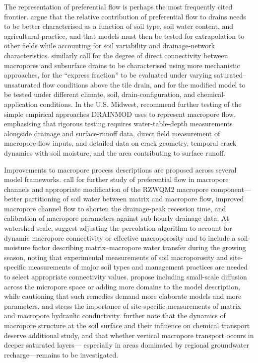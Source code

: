 The representation of preferential flow is perhaps the most frequently cited
frontier. \textcite{Gaillot2023} argue that the relative contribution of
preferential flow to drains needs to be better characterised as a function of
soil type, soil water content, and agricultural practice, and that models must
then be tested for extrapolation to other fields while accounting for soil
variability and drainage-network characteristics. \textcite{Fox2004}
similarly call for the degree of direct connectivity between macropores and
subsurface drains to be characterised using more mechanistic approaches, for
the ``express fraction'' to be evaluated under varying saturated--unsaturated
flow conditions above the tile drain, and for the modified model to be tested
under different climate, soil, drain-configuration, and chemical-application
conditions. In the U.S. Midwest, \textcite{Askar2020} recommend further
testing of the simple empirical approaches DRAINMOD uses to represent
macropore flow, emphasising that rigorous testing requires water-table-depth
measurements alongside drainage and surface-runoff data, direct field
measurement of macropore-flow inputs, and detailed data on crack geometry,
temporal crack dynamics with soil moisture, and the area contributing to
surface runoff.

Improvements to macropore process descriptions are proposed across several
model frameworks. \textcite{Li2023d} call for further study of preferential
flow in macropore channels and appropriate modification of the RZWQM2
macropore component---better partitioning of soil water between matrix and
macropore flow, improved macropore channel flow to shorten the drainage-peak
recession time, and calibration of macropore parameters against sub-hourly
drainage data. At watershed scale, \textcite{Poon2021} suggest adjusting the
percolation algorithm to account for dynamic macropore connectivity or
effective macroporosity and to include a soil-moisture factor describing
matrix--macropore water transfer during the growing season, noting that
experimental measurements of soil macroporosity and site-specific measurements
of major soil types and management practices are needed to select appropriate
connectivity values. \textcite{Villholth1998b} propose including small-scale
diffusion across the micropore space or adding more domains to the model
description, while cautioning that such remedies demand more elaborate models
and more parameters, and stress the importance of site-specific measurements
of matrix and macropore hydraulic conductivity. \textcite{Villholth1998}
further note that the dynamics of macropore structure at the soil surface and
their influence on chemical transport deserve additional study, and that
whether vertical macropore transport occurs in deeper saturated layers---
especially in areas dominated by regional groundwater recharge---remains to be
investigated.

